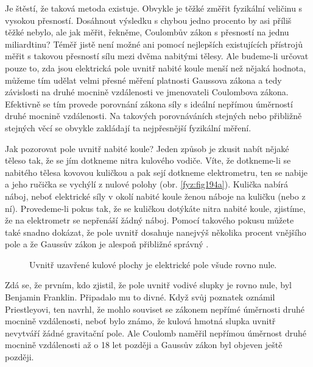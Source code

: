   Je štěstí, že taková metoda existuje. Obvykle je těžké změřit fyzikální veličinu s vysokou 
  přesností. Dosáhnout výsledku s chybou jedno procento by asi příliš těžké nebylo, ale jak 
  měřit, řekněme, Coulombův zákon s přesností na jednu miliardtinu? Téměř jistě není možné ani 
  pomocí nejlepších existujících přístrojů měřit s takovou přesností sílu mezi dvěma nabitými 
  tělesy. Ale budeme-li určovat pouze to, zda jsou elektrická pole uvnitř nabité koule menší 
  než nějaká hodnota, můžeme tím udělat velmi přesné měření platnosti Gaussova zákona a tedy 
  závislosti na druhé mocnině vzdálenosti ve jmenovateli Coulombova zákona. Efektivně se tím 
  provede porovnání zákona síly s ideální nepřímou úměrností druhé mocnině vzdálenosti. Na 
  takových porovnáváních stejných nebo přibližně stejných věcí se obvykle zakládají ta 
  nejpřesnější fyzikální měření.
  
  Jak pozorovat pole uvnitř nabité koule? Jeden způsob je zkusit nabít nějaké těleso tak, že se 
  jím dotkneme nitra kulového vodiče. Víte, že dotkneme-li se nabitého tělesa kovovou kuličkou 
  a pak sejí dotkneme elektrometru, ten se nabije a jeho ručička se vychýlí z nulové polohy 
  (obr. \ref{fyz:fig194a}). Kulička nabírá náboj, neboť elektrické síly v okolí 
  nabité koule ženou náboje na kuličku (nebo z ní). Provedeme-li pokus tak, že se kuličkou 
  dotýkáte nitra nabité koule, zjistíme, že na elektrometr se nepřenáší žádný náboj. Pomocí 
  takového pokusu můžete také snadno dokázat, že pole uvnitř dosahuje nanejvýš několika procent 
  vnějšího pole a že Gaussův zákon je alespoň přibližné správný \cite[s.~91]{Feynman02}.
  \begin{figure}[hb!]
    \centering
    \caption{Uvnitř uzavřené kulové plochy je elektrické pole všude rovno nule.}
    \label{fyz:fig194}
  \end{figure}
    
  Zdá se, že prvním, kdo zjistil, že pole uvnitř vodivé slupky je rovno nule, byl Benjamin 
  Franklin. Připadalo mu to divné. Když svůj poznatek oznámil Priestleyovi, ten navrhl, že 
  mohlo souviset se zákonem nepřímé úměrnosti druhé mocnině vzdálenosti, neboť bylo známo, že 
  kulová hmotná slupka uvnitř nevytváří žádné gravitační pole. Ale Coulomb naměřil nepřímou 
  úměrnost druhé mocnině vzdálenosti až o 18 let později a Gaussův zákon byl objeven ještě 
  později.
  
